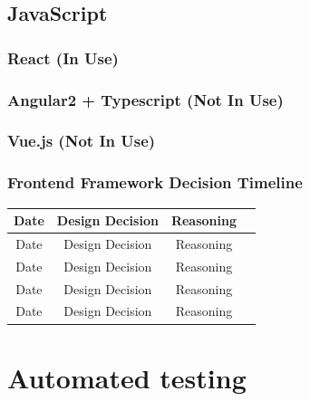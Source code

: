 \documentclass[12pt]{article}
\begin{document}
	\subsection{JavaScript}
	
	\subsubsection{React (In Use)}
	
	\subsubsection{Angular2 + Typescript (Not In Use)}
	
	\subsubsection{Vue.js (Not In Use)}
	
	\subsubsection{Frontend Framework Decision Timeline}
	

		\begin{center}
		\begin{tabular}{ |c|c|c|c| } 
		\hline
		Date & Design Decision & Reasoning \\
		\hline
		Date & Design Decision & Reasoning \\
		\hline
		Date & Design Decision & Reasoning \\
		\hline
		Date & Design Decision & Reasoning \\
		\hline
		Date & Design Decision & Reasoning \\
		\hline
		\end{tabular}
		\end{center}	




\newpage

\section{Automated testing}
\end{document}

